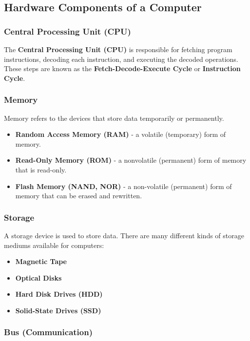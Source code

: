 \documentclass[pdftex,10pt]{article}
\begin{document}
\subsection{Hardware Components of a Computer}


\subsubsection{Central Processing Unit (CPU)}

The \textbf{Central Processing Unit (CPU)} is responsible for fetching program instructions, decoding each instruction, and executing the decoded operations. These steps are known as the \textbf{Fetch-Decode-Execute Cycle} or \textbf{Instruction Cycle}.

\subsubsection{Memory}

Memory refers to the devices that store data temporarily or permanently.

\begin{itemize}
    \item \textbf{Random Access Memory (RAM)} - a volatile (temporary) form of memory.
    \item \textbf{Read-Only Memory (ROM)} - a nonvolatile (permanent) form of memory that is read-only.
    \item \textbf{Flash Memory (NAND, NOR)} - a non-volatile (permanent) form of memory that can be erased and rewritten.
\end{itemize}

\subsubsection{Storage}

A storage device is used to store data. There are many different kinds of storage mediums available for computers:

\begin{itemize}
    \item \textbf{Magnetic Tape}
    \item \textbf{Optical Disks}
    \item \textbf{Hard Disk Drives (HDD)}
    \item \textbf{Solid-State Drives (SSD)}
\end{itemize}

\subsubsection{Bus (Communication)}
\end{document}
